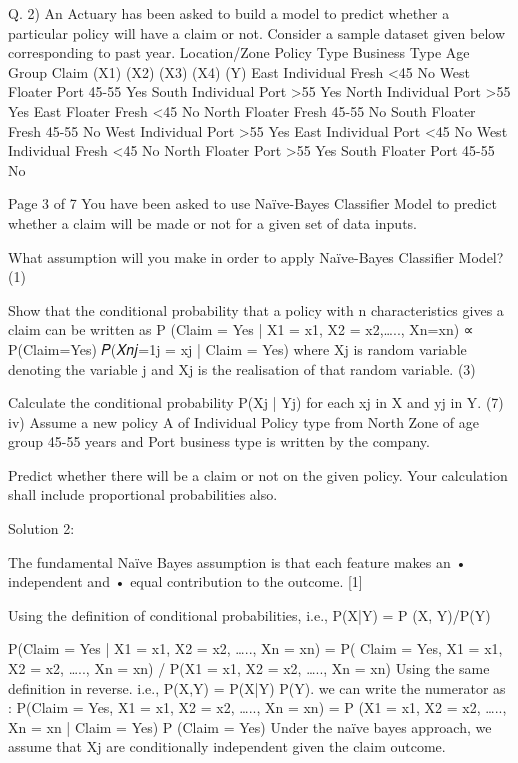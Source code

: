 Q. 2)
An Actuary has been asked to build a model to predict whether a particular policy will have a claim or not. Consider a sample dataset given below corresponding to past year.
Location/Zone
Policy Type
Business Type
Age Group
Claim
(X1)
(X2)
(X3)
(X4)
(Y)
East
Individual
Fresh
<45
No
West
Floater
Port
45-55
Yes
South
Individual
Port
>55
Yes
North
Individual
Port
>55
Yes
East
Floater
Fresh
<45
No
North
Floater
Fresh
45-55
No
South
Floater
Fresh
45-55
No
West
Individual
Port
>55
Yes
East
Individual
Port
<45
No
West
Individual
Fresh
<45
No
North
Floater
Port
>55
Yes
South
Floater
Port
45-55
No

Page 3 of 7
You have been asked to use Naïve-Bayes Classifier Model to predict whether a claim will be made or not for a given set of data inputs.
\item What assumption will you make in order to apply Naïve-Bayes Classifier Model?
(1)
\item Show that the conditional probability that a policy with n characteristics gives a claim can be written as
P (Claim = Yes | X1 = x1, X2 = x2,….., Xn=xn) ∝ P(Claim=Yes) \pi 𝑃(𝑋𝑛𝑗=1j = xj | Claim = Yes)
where Xj is random variable denoting the variable j and Xj is the realisation of that random variable.
(3)
\item Calculate the conditional probability P(Xj | Yj) for each xj in X and yj in Y.
(7)
iv) Assume a new policy A of Individual Policy type from North Zone of age group 45-55 years and Port business type is written by the company. 

Predict whether there will be a claim or not on the given policy. Your calculation shall include proportional probabilities also.


Solution 2:
\item
The fundamental Naïve Bayes assumption is that each feature makes an
• independent and
• equal
contribution to the outcome.
[1]
\item
Using the definition of conditional probabilities, i.e., P(X|Y) = P (X, Y)/P(Y)


P(Claim = Yes | X1 = x1, X2 = x2, ….., Xn = xn) = P( Claim = Yes, X1 = x1, X2 = x2, ….., Xn = xn) / P(X1 = x1, X2 = x2, ….., Xn = xn)
Using the same definition in reverse. i.e., P(X,Y) = P(X|Y) P(Y). we can write the numerator as :
P(Claim = Yes, X1 = x1, X2 = x2, ….., Xn = xn) = P (X1 = x1, X2 = x2, ….., Xn = xn | Claim = Yes) P (Claim = Yes)
Under the naïve bayes approach, we assume that Xj are conditionally independent given the claim outcome. 

